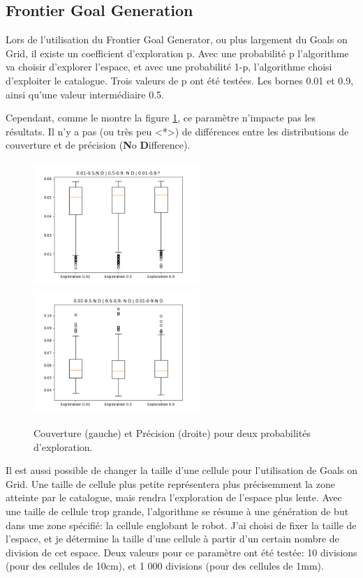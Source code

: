 \documentclass[11pt,french]{report}
\begin{document}
\pagebreak

\subsection{Frontier Goal Generation}

Lors de l'utilisation du Frontier Goal Generator, ou plus largement du Goals on Grid, il existe un coefficient d'exploration p.
Avec une probabilité p l'algorithme va choisir d'explorer l'espace, et avec une probabilité 1-p, l'algorithme choisi d'exploiter le catalogue.
Trois valeurs de p ont été testées.
Les bornes 0.01 et 0.9, ainsi qu'une valeur intermédiaire 0.5.

Cependant, comme le montre la figure \ref{fig:effet_pexp}, ce paramètre n'impacte pas les résultats.
Il n'y a pas (ou très peu <*>) de différences entre les distributions de couverture et de précision (\textbf{N}o \textbf{D}ifference).

\begin{figure}[h]
    \centering
    \includegraphics[width=178pt]{Fro_.01-.5-.9pexp_couver.png} \includegraphics[width=178pt]{Fro_.01-.5-.9pexp_moy_gl.png}
    \caption{Couverture (gauche) et Précision (droite) pour deux probabilités d'exploration.}
    \label{fig:effet_pexp}
\end{figure}

Il est aussi possible de changer la taille d'une cellule pour l'utilisation de Goals on Grid.
Une taille de cellule plus petite représentera plus précisemment la zone atteinte par le catalogue, mais rendra l'exploration de l'espace plus lente.
Avec une taille de cellule trop grande, l'algorithme se résume à une génération de but dans une zone spécifié: la cellule englobant le robot.
J'ai choisi de fixer la taille de l'espace, et je détermine la taille d'une cellule à partir d'un certain nombre de division de cet espace.
Deux valeurs pour ce paramètre ont été testée: 10 divisions (pour des cellules de 10cm), et 1 000 divisions (pour des cellules de 1mm).
\end{document}
